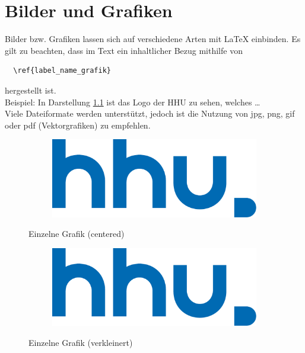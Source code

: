 \chapter{Bilder und Grafiken}

Bilder bzw. Grafiken lassen sich auf verschiedene Arten mit LaTeX einbinden.
Es gilt zu beachten, dass im Text ein inhaltlicher Bezug mithilfe von

\begin{verbatim}
  \ref{label_name_grafik}
\end{verbatim}

hergestellt ist.\\

Beispiel: In Darstellung \ref{grafik_1} ist das Logo der HHU zu sehen, welches \ldots\\

Viele Dateiformate werden unterstützt, jedoch ist die Nutzung von jpg, png, gif oder pdf (Vektorgrafiken) zu empfehlen.\\

\begin{figure}[h]
  \centering
  \begin{subfigure}[b]{1.0\textwidth}
    \includegraphics[width=1.0\linewidth]{img/hhu}
  \end{subfigure}
  \caption{Einzelne Grafik (centered)}
  \label{grafik_1}
\end{figure}


\clearpage

\begin{figure}
  \centering
  \begin{subfigure}[b]{0.5\textwidth}
    \includegraphics[width=1.0\linewidth]{img/hhu}
  \end{subfigure}
  \caption{Einzelne Grafik (verkleinert)}
  \label{grafik_2}
\end{figure}

